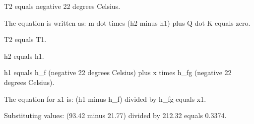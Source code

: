 T2 equals negative 22 degrees Celsius.  

The equation is written as:  
m dot times (h2 minus h1) plus Q dot K equals zero.  

T2 equals T1.  

h2 equals h1.  

h1 equals h_f (negative 22 degrees Celsius) plus x times h_fg (negative 22 degrees Celsius).  

The equation for x1 is:  
(h1 minus h_f) divided by h_fg equals x1.  

Substituting values:  
(93.42 minus 21.77) divided by 212.32 equals 0.3374.